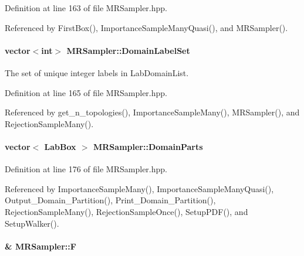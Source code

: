 \-Definition at line 163 of file \-M\-R\-Sampler.\-hpp.



\-Referenced by \-First\-Box(), \-Importance\-Sample\-Many\-Quasi(), and \-M\-R\-Sampler().

\hypertarget{classMRSampler_a8497e118c2d180ff59884897ff97ff4d}{
\paragraph[{\-Domain\-Label\-Set}]{\setlength{\rightskip}{0pt plus 5cm}vector$<$int$>$ {\bf \-M\-R\-Sampler\-::\-Domain\-Label\-Set}}}\label{classMRSampler_a8497e118c2d180ff59884897ff97ff4d}


\-The set of unique integer labels in \-Lab\-Domain\-List. 



\-Definition at line 165 of file \-M\-R\-Sampler.\-hpp.



\-Referenced by get\-\_\-n\-\_\-topologies(), \-Importance\-Sample\-Many(), \-M\-R\-Sampler(), and \-Rejection\-Sample\-Many().

\hypertarget{classMRSampler_aea43aaf9d80cae23dc971ab12d706ef8}{
\paragraph[{\-Domain\-Parts}]{\setlength{\rightskip}{0pt plus 5cm}vector$<$ {\bf \-Lab\-Box} $>$ {\bf \-M\-R\-Sampler\-::\-Domain\-Parts}}}\label{classMRSampler_aea43aaf9d80cae23dc971ab12d706ef8}


\-Definition at line 176 of file \-M\-R\-Sampler.\-hpp.



\-Referenced by \-Importance\-Sample\-Many(), \-Importance\-Sample\-Many\-Quasi(), \-Output\-\_\-\-Domain\-\_\-\-Partition(), \-Print\-\_\-\-Domain\-\_\-\-Partition(), \-Rejection\-Sample\-Many(), \-Rejection\-Sample\-Once(), \-Setup\-P\-D\-F(), and \-Setup\-Walker().

\hypertarget{classMRSampler_ab836cfbff1570a96b8af9c384226edfc}{
\paragraph[{\-F}]{\& {\bf \-M\-R\-Sampler\-::\-F}}}\label{classMRSampler_ab836cfbff1570a96b8af9c384226edfc}


